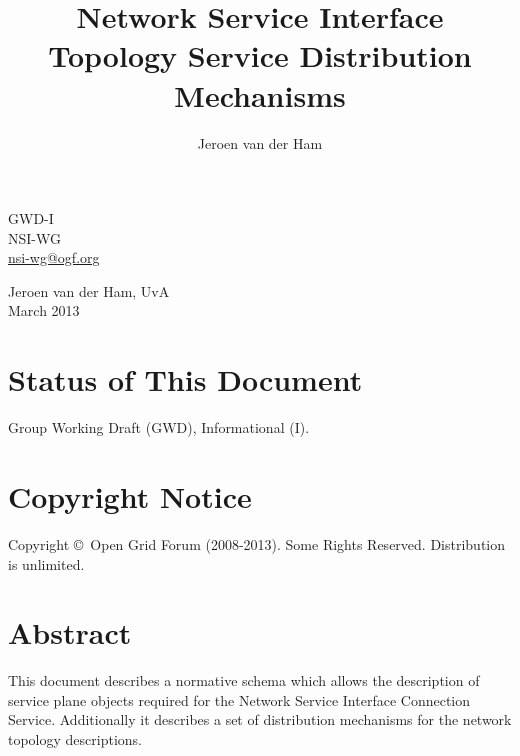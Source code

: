 \documentclass[12pt]{article}  %
\title{Network Service Interface Topology Service Distribution Mechanisms}
\author{Jeroen van der Ham}
\newcommand{\headerstyle}{\sffamily} %
\newcommand{\ifnonempty}[2]{\ifthenelse{\isundefined{#1}}{}{\ifthenelse{\equal{#1}{}}{}{#2}}}
\newcommand{\authorsshort}{Jeroen van der Ham, UvA}
\newcommand{\publicationdate}{March 2013}  %
\newcommand{\copyrightyears}{2008-2013}  %
\newcommand{\docseries}{GWD-I}  %
\begin{document}
{\noindent
\begin{minipage}[t]{1.5in}
\headerstyle
\docseries \\
NSI-WG \\
\href{mailto:nsi-wg@ogf.org}{nsi-wg@ogf.org}
\end{minipage}
\hfill
\raggedleft
\begin{minipage}[t]{4.5in}
\raggedleft
\headerstyle
\authorsshort \\
\vspace{1em}
\publicationdate \\
\ifnonempty{\revisiondate}{Revised \revisiondate \\}
\end{minipage}
}

\vspace{1em}
\begin{center}
\makeatletter
\Large\bf\textsf \@title
\makeatother
\end{center}


\section*{Status of This Document}

Group Working Draft (GWD), Informational (I).


% 

\section*{Copyright Notice}

Copyright \copyright \ Open Grid Forum (\copyrightyears).  Some Rights Reserved.  
Distribution is unlimited.

\section*{Abstract}

This document describes a normative schema which allows the
description of service plane objects required for the Network Service Interface Connection Service. Additionally it describes a set of distribution mechanisms for the network topology descriptions.
\end{document}
